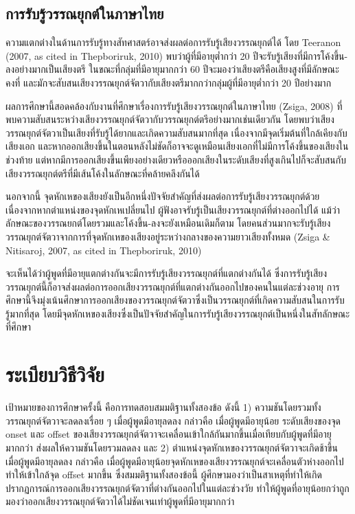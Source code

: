 \documentclass[a4paper]{article}
\begin{document}
\subsection{การรับรู้วรรณยุกต์ในภาษาไทย}
    ความแตกต่างในด้านการรับรู้ทางสัทศาสตร์อาจส่งผลต่อการรับรู้เสียงวรรณยุกต์ได้ โดย Teeranon (2007, as cited in Thepboriruk, 2010) พบว่าผู้ที่มีอายุต่ำกว่า 20 ปีจะรับรู้เสียงที่มีการโค้งขึ้น-ลงอย่างมากเป็นเสียงตรี ในขณะที่กลุ่มที่มีอายุมากกว่า 60 ปีจะมองว่าเสียงตรีคือเสียงสูงที่มีลักษณะคงที่ และมักจะสับสนเสียงวรรณยุกต์จัตวากับเสียงตรีมากกว่ากลุ่มผู้ที่มีอายุต่ำกว่า 20 ปีอย่างมาก

    ผลการศึกษานี้สอดคล้องกับงานที่ศึกษาเรื่องการรับรู้เสียงวรรณยุกต์ในภาษาไทย (Zsiga, 2008) ที่พบความสับสนระหว่างเสียงวรรณยุกต์จัตวากับวรรณยุกต์ตรีอย่างมากเช่นเดียวกัน โดยพบว่าเสียงวรรณยุกต์จัตวาเป็นเสียงที่รับรู้ได้ยากและเกิดความสับสนมากที่สุด เนื่องจากมีจุดเริ่มต้นที่ใกล้เคียงกับเสียงเอก และหากออกเสียงขึ้นในตอนหลังไม่ชัดก็อาจจะดูเหมือนเสียงเอกที่ไม่มีการโค้งขึ้นของเสียงในช่วงท้าย แต่หากมีการออกเสียงขึ้นเพียงอย่างเดียวหรือออกเสียงในระดับเสียงที่สูงเกินไปก็จะสับสนกับเสียงวรรณยุกต์ตรีที่มีเส้นโค้งในลักษณะที่คล้ายคลึงกันได้

    นอกจากนี้ จุดหักเหของเสียงยังเป็นอีกหนึ่งปัจจัยสำคัญที่ส่งผลต่อการรับรู้เสียงวรรณยุกต์ด้วย เนื่องจากหากตำแหน่งของจุดหักเหเปลี่ยนไป ผู้ฟังอาจรับรู้เป็นเสียงวรรณยุกต์ที่ต่างออกไปได้ แม้ว่าลักษณะของวรรณยกต์โดยรวมและโค้งขึ้น-ลงจะยังเหมือนเดิมก็ตาม โดยคนส่วนมากจะรับรู้เสียงวรรณยุกต์จัตวาจากการที่จุดหักเหของเสียงอยู่ระหว่างกลางของความยาวเสียงทั้งหมด (Zsiga \& Nitisaroj, 2007, as cited in Thepboriruk, 2010)

    จะเห็นได้ว่าผู้พูดที่มีอายุแตกต่างกันจะมีการรับรู้เสียงวรรณยุกต์ที่แตกต่างกันได้ ซึ่งการรับรู้เสียงวรรณยุกต์นี้ก็อาจส่งผลต่อการออกเสียงวรรณยุกต์ที่แตกต่างกันออกไปของคนในแต่ละช่วงอายุ การศึกษานี้จึงมุ่งเน้นศึกษาการออกเสียงของวรรณยุกต์จัตวาซึ่งเป็นวรรณยุกต์ที่เกิดความสับสนในการรับรู้มากที่สุด โดยมีจุดหักเหของเสียงซึ่งเป็นปัจจัยสำคัญในการรับรู้เสียงวรรณยุกต์เป็นหนึ่งในสัทลักษณะที่ศึกษา
\section{ระเบียบวิธีวิจัย}
    เป้าหมายของการศึกษาครั้งนี้ คือการทดสอบสมมติฐานทั้งสองข้อ ดังนี้ 1) ความชันโดยรวมทั้งวรรณยุกต์จัตวาจะลดลงเรื่อย ๆ เมื่อผู้พูดมีอายุลดลง กล่าวคือ เมื่อผู้พูดมีอายุน้อย ระดับเสียงของจุด onset และ offset ของเสียงวรรณยุกต์จัตวาจะเคลื่อนเข้าใกล้กันมากขึ้นเมื่อเทียบกับผู้พูดที่มีอายุมากกว่า ส่งผลให้ความชันโดยรวมลดลง และ 2) ตำแหน่งจุดหักเหของวรรณยุกต์จัตวาจะเกิดช้าขึ้น เมื่อผู้พูดมีอายุลดลง กล่าวคือ เมื่อผู้พูดมีอายุน้อยจุดหักเหของเสียงวรรณยุกต์จะเคลื่อนตัวห่างออกไป ทำให้เข้าใกล้จุด offset มากขึ้น ซึ่งสมมติฐานทั้งสองข้อนี้ ผู้ศึกษามองว่าเป็นสาเหตุที่ทำให้เกิดปรากฏการณ์การออกเสียงวรรณยุกต์จัตวาที่ต่างกันออกไปในแต่ละช่วงวัย ทำให้ผู้พูดที่อายุน้อยกว่าถูกมองว่าออกเสียงวรรณยุกต์จัตวาได้ไม่ชัดเจนเท่าผู้พูดที่มีอายุมากกว่า
\end{document}
